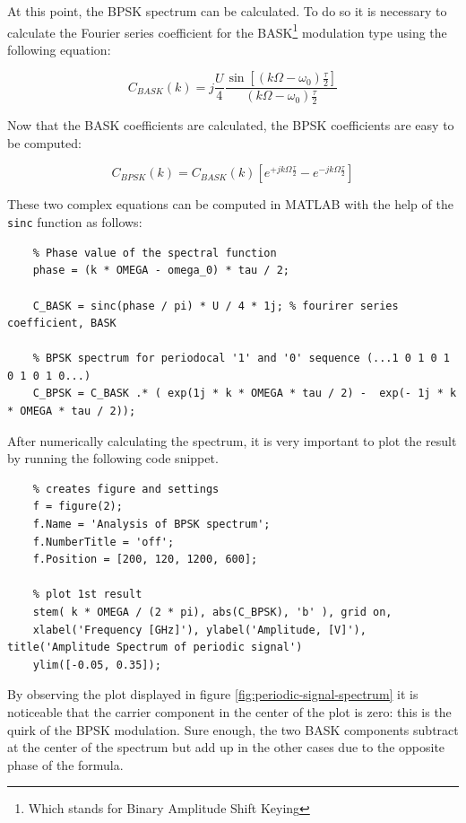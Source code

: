 \noindent At this point, the BPSK spectrum can be calculated. To do so it is necessary to calculate the Fourier series coefficient for the BASK\footnote{Which stands for Binary Amplitude Shift Keying} modulation type using the following equation:

\begin{equation*}
    C_{BASK}(k) = j\frac{U}{4} \frac{\sin\left[ \left( k\Omega - \omega_0 \right) \frac{\tau}{2}\right]}{\left( k\Omega - \omega_0 \right) \frac{\tau}{2}}
\end{equation*}

\noindent Now that the BASK coefficients are calculated, the BPSK coefficients are easy to be computed:

\begin{equation*}
    C_{BPSK}(k) = C_{BASK}(k) \left[ e^{+jk\Omega\frac{\tau}{2}} - e^{-jk\Omega\frac{\tau}{2}} \right]
\end{equation*}

\noindent These two complex equations can be computed in MATLAB with the help of the \texttt{sinc} function as follows:

\begin{lstlisting}
    % Phase value of the spectral function
    phase = (k * OMEGA - omega_0) * tau / 2;

    C_BASK = sinc(phase / pi) * U / 4 * 1j; % fourirer series coefficient, BASK

    % BPSK spectrum for periodocal '1' and '0' sequence (...1 0 1 0 1 0 1 0 1 0...)
    C_BPSK = C_BASK .* ( exp(1j * k * OMEGA * tau / 2) -  exp(- 1j * k * OMEGA * tau / 2));
\end{lstlisting}

\noindent After numerically calculating the spectrum, it is very important to plot the result by running the following code snippet.

\begin{lstlisting}
    % creates figure and settings
    f = figure(2);
    f.Name = 'Analysis of BPSK spectrum';
    f.NumberTitle = 'off';
    f.Position = [200, 120, 1200, 600];
    
    % plot 1st result
    stem( k * OMEGA / (2 * pi), abs(C_BPSK), 'b' ), grid on,
    xlabel('Frequency [GHz]'), ylabel('Amplitude, [V]'), title('Amplitude Spectrum of periodic signal')
    ylim([-0.05, 0.35]);
\end{lstlisting}

\noindent By observing the plot displayed in figure \ref{fig:periodic-signal-spectrum} it is noticeable that the carrier component in the center of the plot is zero: this is the quirk of the BPSK modulation. Sure enough, the two BASK components subtract at the center of the spectrum but add up in the other cases due to the opposite phase of the formula. 

